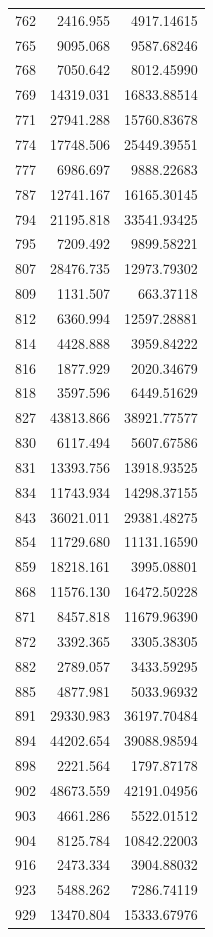 \documentclass[
  12pt,
]{article}
\begin{document}
\begin{longtable}[]{@{}lrr@{}}
762 & 2416.955 & 4917.14615 \\
765 & 9095.068 & 9587.68246 \\
768 & 7050.642 & 8012.45990 \\
769 & 14319.031 & 16833.88514 \\
771 & 27941.288 & 15760.83678 \\
774 & 17748.506 & 25449.39551 \\
777 & 6986.697 & 9888.22683 \\
787 & 12741.167 & 16165.30145 \\
794 & 21195.818 & 33541.93425 \\
795 & 7209.492 & 9899.58221 \\
807 & 28476.735 & 12973.79302 \\
809 & 1131.507 & 663.37118 \\
812 & 6360.994 & 12597.28881 \\
814 & 4428.888 & 3959.84222 \\
816 & 1877.929 & 2020.34679 \\
818 & 3597.596 & 6449.51629 \\
827 & 43813.866 & 38921.77577 \\
830 & 6117.494 & 5607.67586 \\
831 & 13393.756 & 13918.93525 \\
834 & 11743.934 & 14298.37155 \\
843 & 36021.011 & 29381.48275 \\
854 & 11729.680 & 11131.16590 \\
859 & 18218.161 & 3995.08801 \\
868 & 11576.130 & 16472.50228 \\
871 & 8457.818 & 11679.96390 \\
872 & 3392.365 & 3305.38305 \\
882 & 2789.057 & 3433.59295 \\
885 & 4877.981 & 5033.96932 \\
891 & 29330.983 & 36197.70484 \\
894 & 44202.654 & 39088.98594 \\
898 & 2221.564 & 1797.87178 \\
902 & 48673.559 & 42191.04956 \\
903 & 4661.286 & 5522.01512 \\
904 & 8125.784 & 10842.22003 \\
916 & 2473.334 & 3904.88032 \\
923 & 5488.262 & 7286.74119 \\
929 & 13470.804 & 15333.67976 \\

\end{longtable}
\end{document}
